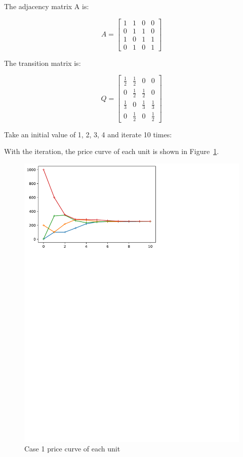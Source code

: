 \documentclass[conference]{IEEEtran}
\begin{document}
The adjacency matrix A is:

\begin{equation}
    A=\left[\begin{array}{cccc}
    {1} & {1} & {0} & {0} \\
    {0} & {1} & {1} & {0} \\
    {1} & {0} & {1} & {1} \\
    {0} & {1} & {0} & {1}
    \end{array}\right]
\end{equation}

The transition matrix is:

\begin{equation}
    Q=\left[\begin{array}{cccc}
    {\frac{1}{2}} & {\frac{1}{2}} & {0} & {0} \\
    {0} & {\frac{1}{2}} & {\frac{1}{2}} & {0} \\
    {\frac{1}{3}} & {0} & {\frac{1}{3}} & {\frac{1}{3}} \\
    {0} & {\frac{1}{2}} & {0} & {\frac{1}{2}}
    \end{array}\right]
\end{equation}

Take an initial value of 1, 2, 3, 4 and iterate 10 times:

With the iteration, the price curve of each unit is shown in Figure~\ref{fig:Result-1234}.

\begin{figure}[htbp]
    \centering
    \includegraphics[width=\columnwidth]{1234.pdf}
    \caption{Case 1 price curve of each unit}
    \label{fig:Result-1234}
\end{figure}
\end{document}
